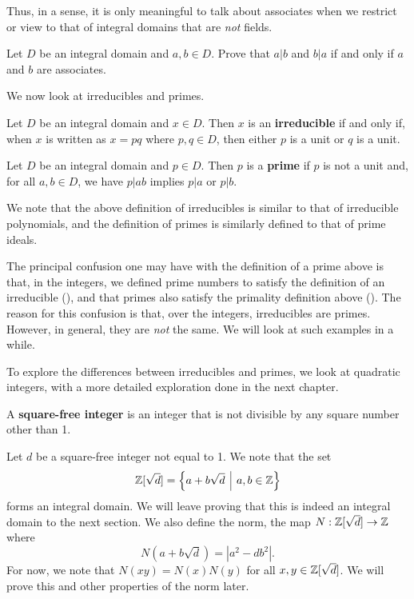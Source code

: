 Thus, in a sense, it is only meaningful to talk about associates when we restrict or view to that of integral domains that are \textit{not} fields.

\begin{exercise}
    Let $D$ be an integral domain and $a,b \in D$. Prove that $a \vert b$ and $b \vert a$ if and only if $a$ and $b$ are associates.
\end{exercise}

We now look at irreducibles and primes.
\begin{definition}
    Let $D$ be an integral domain and $x \in D$. Then $x$ is an \textbf{irreducible} if and only if, when $x$ is written as $x = pq$ where $p, q \in D$, then either $p$ is a unit or $q$ is a unit.
\end{definition}
\begin{definition}
    Let $D$ be an integral domain and $p \in D$. Then $p$ is a \textbf{prime} if $p$ is not a unit and, for all $a, b \in D$, we have $p \vert ab$ implies $p \vert a$ or $p \vert b$.
\end{definition}

We note that the above definition of irreducibles is similar to that of irreducible polynomials, and the definition of primes is similarly defined to that of prime ideals.

The principal confusion one may have with the definition of a prime above is that, in the integers, we defined prime numbers to satisfy the definition of an irreducible (), and that primes also satisfy the primality definition above (). The reason for this confusion is that, over the integers, irreducibles are primes. However, in general, they are \textit{not} the same. We will look at such examples in a while.

To explore the differences between irreducibles and primes, we look at quadratic integers, with a more detailed exploration done in the next chapter.
\begin{definition}
    A \textbf{square-free integer} is an integer that is not divisible by any square number other than 1.
\end{definition}

Let $d$ be a square-free integer not equal to 1. We note that the set 
\[
    \Z[\sqrt{d}] = \left\{a + b\sqrt{d} \vert a,b \in \Z\right\}
\]
forms an integral domain. We will leave proving that this is indeed an integral domain to the next section. We also define the norm, the map $N: \mathbb{Z}[\sqrt{d}] \to \mathbb{Z}$ where
\[
    N(a+b\sqrt{d}) = |a^2 - db^2|.
\]
For now, we note that $N(xy) = N(x)N(y)$ for all $x, y \in \mathbb{Z}[\sqrt{d}]$. We will prove this and other properties of the norm later.


